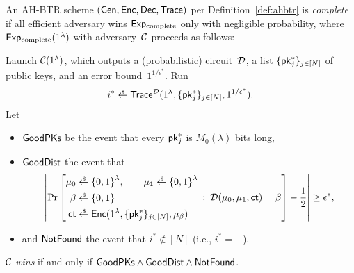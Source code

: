 \begin{definition}[completeness]\label{def:completeness}
An AH-BTR scheme $(\Gen,\Enc,\Dec,\Trace)$ per Definition~\ref{def:ahbtr} is \emph{complete}
if all efficient adversary wins $\ExpComplete$ only with negligible probability,
where $\ExpComplete(1^\lambda)$ with adversary~${\mathcal{C}}$ proceeds as follows:
\begin{security}
Launch ${\mathcal{C}}(1^\lambda)$,
which outputs a (probabilistic) circuit~${\mathcal{D}}$,
a list $\{\pk_j^\ast\}_{j\in[N]}$ of public keys, and
an error bound~$1^{1/\epsilon^\ast}$.
Run
\begin{align*}
i^\ast\draws\Trace^\scriptD(1^\lambda,\{\pk^\ast_j\}_{j\in[N]},1^{1/\epsilon^\ast}).
\end{align*}
Let
\begin{itemize}
\item $\GoodPKs$ be the event that every $\pk^\ast_j$ is $M_0(\lambda)$ bits long,
\item $\GoodDist$ the event that
\begin{align*}
\left|\Pr\left[
\begin{aligned}
\mu_0&{}\draws\bit^\lambda,\qquad
\mu_1\draws\bit^\lambda\\
\beta&{}\draws\bit\\
\ct&{}\draws\Enc(1^\lambda,\{\pk^\ast_j\}_{j\in[N]},\mu_\beta)
\end{aligned}
\::\:
\scriptD(\mu_0,\mu_1,\ct)=\beta
\right]-\frac12
\right|
\geq\epsilon^\ast,
\end{align*}
\item and
$\NotFound$ the event that ${i^\ast\notin[N]}$ (i.e., ${i^\ast=\bot}$).
\end{itemize}
${\mathcal{C}}$ \emph{wins} if and only if ${\GoodPKs\wedge\GoodDist\wedge\NotFound}$.
\end{security}
\end{definition}
